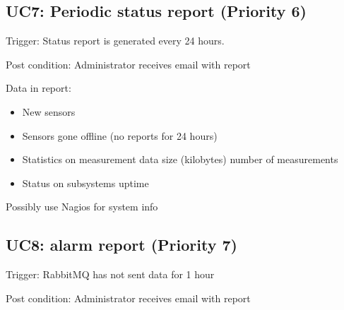 \subsection*{UC7: Periodic status report (Priority 6)}
\noindent Trigger: Status report is generated every 24 hours.

\noindent Post condition: Administrator receives email with report

\noindent Data in report: 
\begin{itemize}
    \item New sensors
    \item Sensors gone offline (no reports for 24 hours)
    \item Statistics on measurement data
        \subitem size (kilobytes)
        \subitem number of measurements
    \item Status on subsystems 
        \subitem uptime
\end{itemize}
Possibly use Nagios for system info


\subsection*{UC8: alarm report (Priority 7)}
\noindent Trigger: RabbitMQ has not sent data for 1 hour

\noindent Post condition: Administrator receives email with report
